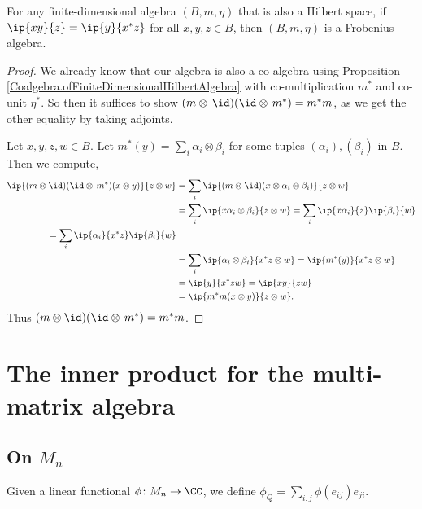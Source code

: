  \begin{proposition}\label{FiniteDimensionalCoAlgebra_isFrobeniusAlgebra_of}
  \leanok
  For any finite-dimensional algebra $(B,m,\eta)$ that is also a Hilbert space, if $\ip{xy}{z}=\ip{y}{x^*z}$ for all $x,y,z\in B$, then $(B,m,\eta)$ is a Frobenius algebra.
 \end{proposition}
 \begin{proof}\leanok
  We already know that our algebra is also a co-algebra using Proposition \ref{Coalgebra.ofFiniteDimensionalHilbertAlgebra} with co-multiplication $m^*$ and co-unit $\eta^*$.
  So then it suffices to show $(m\otimes\,\id)(\id\otimes\,m^*)=m^*m$, as we get the other equality by taking adjoints.

  Let $x,y,z,w\in{B}$. Let $m^*(y)=\sum_i\alpha_i\otimes\beta_i$ for some tuples $(\alpha_i),(\beta_i)$ in $B$. Then we compute,
  \begin{align*}
   \ip{(m\otimes\id)(\id\otimes\,m^*)(x\otimes y)}{z\otimes w}
   &= \sum_i\ip{(m\otimes\id)(x\otimes\alpha_i\otimes\beta_i)}{z\otimes w}\\
   &= \sum_i\ip{x\alpha_i\otimes\beta_i}{z\otimes w}
   = \sum_i\ip{x\alpha_i}{z}\ip{\beta_i}{w}\\
   = \sum_i\ip{\alpha_i}{x^*z}\ip{\beta_i}{w}\\
   &= \sum_i\ip{\alpha_i\otimes\beta_i}{x^*z\otimes w}=\ip{m^*(y)}{x^*z\otimes w}\\
   &= \ip{y}{x^*zw}=\ip{xy}{zw}\\
   &= \ip{m^*m(x\otimes y)}{z\otimes w}.
  \end{align*}
  Thus $(m\otimes\id)(\id\otimes\,m^*)=m^*m$.
 \end{proof}


\chapter{The inner product for the multi-matrix algebra}
 \section{On $M_n$}

  \begin{definition}\label{Dual.matrix}\leanok
   Given a linear functional $\phi\colon M_n \to \CC$, we define $\phi_Q=\sum_{i,j}\phi(e_{ij})e_{ji}$.
  \end{definition}

